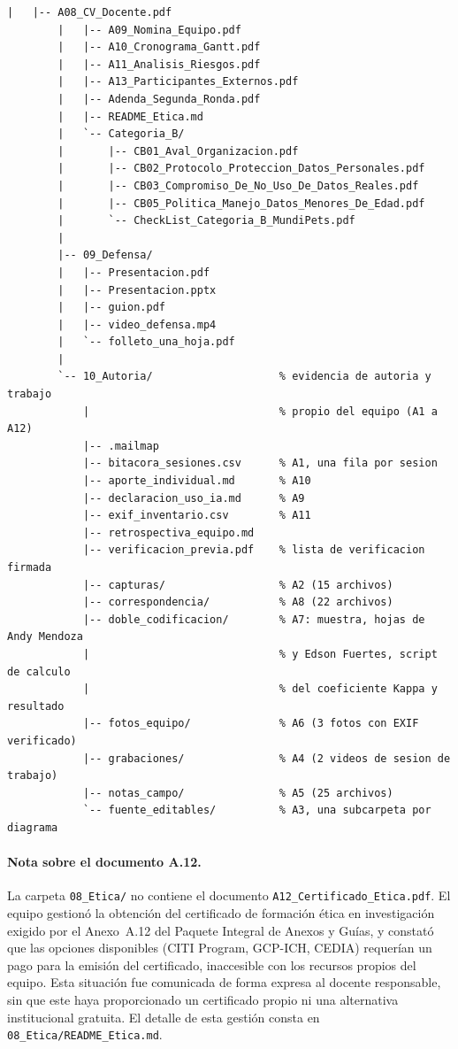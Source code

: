 \documentclass[journal,onecolumn]{IEEEtran}
\begin{document}
\begin{lstlisting}[style=csharp,caption={Estructura de carpetas del repositorio MundiPets-PFC-IngReq.},label={lst:estructura_repo}]
		|   |-- A08_CV_Docente.pdf
		|   |-- A09_Nomina_Equipo.pdf
		|   |-- A10_Cronograma_Gantt.pdf
		|   |-- A11_Analisis_Riesgos.pdf
		|   |-- A13_Participantes_Externos.pdf
		|   |-- Adenda_Segunda_Ronda.pdf
		|   |-- README_Etica.md
		|   `-- Categoria_B/
		|       |-- CB01_Aval_Organizacion.pdf
		|       |-- CB02_Protocolo_Proteccion_Datos_Personales.pdf
		|       |-- CB03_Compromiso_De_No_Uso_De_Datos_Reales.pdf
		|       |-- CB05_Politica_Manejo_Datos_Menores_De_Edad.pdf
		|       `-- CheckList_Categoria_B_MundiPets.pdf
		|
		|-- 09_Defensa/
		|   |-- Presentacion.pdf
		|   |-- Presentacion.pptx
		|   |-- guion.pdf
		|   |-- video_defensa.mp4
		|   `-- folleto_una_hoja.pdf
		|
		`-- 10_Autoria/                    % evidencia de autoria y trabajo
		    |                              % propio del equipo (A1 a A12)
		    |-- .mailmap
		    |-- bitacora_sesiones.csv      % A1, una fila por sesion
		    |-- aporte_individual.md       % A10
		    |-- declaracion_uso_ia.md      % A9
		    |-- exif_inventario.csv        % A11
		    |-- retrospectiva_equipo.md
		    |-- verificacion_previa.pdf    % lista de verificacion firmada
		    |-- capturas/                  % A2 (15 archivos)
		    |-- correspondencia/           % A8 (22 archivos)
		    |-- doble_codificacion/        % A7: muestra, hojas de Andy Mendoza
		    |                              % y Edson Fuertes, script de calculo
		    |                              % del coeficiente Kappa y resultado
		    |-- fotos_equipo/              % A6 (3 fotos con EXIF verificado)
		    |-- grabaciones/               % A4 (2 videos de sesion de trabajo)
		    |-- notas_campo/               % A5 (25 archivos)
		    `-- fuente_editables/          % A3, una subcarpeta por diagrama
	\end{lstlisting}

	\paragraph{Nota sobre el documento A.12.}
	La carpeta \texttt{08\_Etica/} no contiene el documento
	\texttt{A12\_Certificado\_Etica.pdf}. El equipo gestionó la obtención del
	certificado de formación ética en investigación exigido por el Anexo~A.12
	del Paquete Integral de Anexos y Guías, y constató que las opciones
	disponibles (CITI Program, GCP-ICH, CEDIA) requerían un pago para la
	emisión del certificado, inaccesible con los recursos propios del equipo.
	Esta situación fue comunicada de forma expresa al docente responsable, sin
	que este haya proporcionado un certificado propio ni una alternativa
	institucional gratuita. El detalle de esta gestión consta en
	\texttt{08\_Etica/README\_Etica.md}.
	
\end{document}
